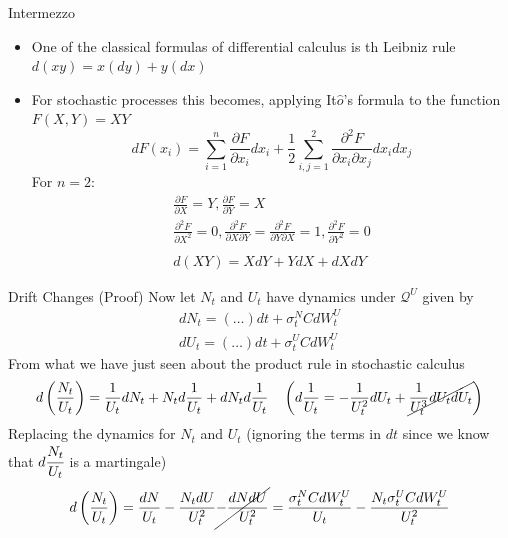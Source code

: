\documentclass{beamer}
\begin{document}
\begin{frame}{Intermezzo}
  \begin{itemize}
  \item One of the classical formulas of differential calculus is th Leibniz rule $d(x y) = x(dy) + y(dx)$
  \item For stochastic processes this becomes, applying It$\hat{o}$'s formula to the function $F(X,Y) = XY$
    \begin{equation*}
      dF(x_i)=\sum_{i=1}^n \frac{\partial F}{\partial x_i}dx_i
      +\frac{1}{2}\sum_{i,j=1}^2 \frac{\partial^2 F}{\partial x_i \partial x_j}dx_i dx_j
    \end{equation*}
  For $n=2$:
    \begin{equation*}
      \begin{gathered}
        \frac{\partial F}{\partial X}=Y,\frac{\partial F}{\partial Y}=X \\
        \frac{\partial^2 F}{\partial X^2}=0,\frac{\partial^2 F}{\partial X\partial Y}=\frac{\partial^2 F}{\partial Y\partial X}=1,\frac{\partial^2 F}{\partial Y^2}=0\\
        \\
        d(XY) = XdY + YdX + dXdY
      \end{gathered}
    \end{equation*}
  \end{itemize}
\end{frame}

\begin{frame}{Drift Changes (Proof)}	
Now let $N_t$ and $U_t$ have dynamics under $\mathcal{Q}^U$ given by 
\begin{equation*}
	\begin{gathered}
		dN_t = (\ldots) dt + \sigma_t^NCdW^U_t\\
		dU_t = (\ldots) dt + \sigma_t^UCdW^U_t 
	\end{gathered}
\end{equation*}
	\pause
        From what we have just seen about the product rule in stochastic calculus
        \begin{equation*}
          \begin{gathered}
            d\left(\frac{N_t}{U_t}\right)=\frac{1}{U_t}dN_t+N_td\frac{1}{U_t}+dN_td\frac{1}{U_t} \quad \left(d\frac{1}{U_t}=-\frac{1}{U^2_t}dU_t+\cancel{\frac{1}{U^3_t}dU_tdU_t}\right) \\
          \end{gathered}
  \end{equation*}
	\pause
  Replacing the dynamics for $N_t$ and $U_t$ (ignoring the terms in $dt$ since we know that $d\cfrac{N_t}{U_t}$ is a martingale)
  \begin{equation}
    d\left(\frac{N_t}{U_t}\right) = \frac{dN}{U_t}-\frac{N_tdU}{U^2_t}\cancel{-\frac{dNdU}{U_t^2}}=\frac{\sigma^N_t CdW^U_t}{U_t} - \frac{N_t\sigma^U_t C dW^U_t}{U^2_t}
    \label{eq:dnu}
  \end{equation}
\end{frame}
\end{document}
